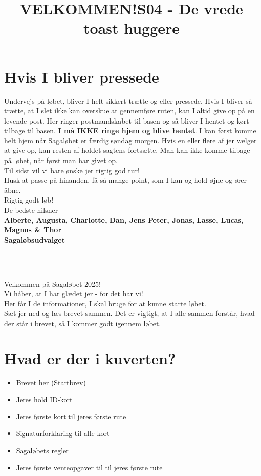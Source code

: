 \section{Hvis I bliver pressede}
Undervejs på løbet, bliver I helt sikkert trætte og eller pressede. Hvis I bliver så trætte, at I slet ikke kan overskue at gennemføre ruten, kan I altid give op på en levende post. Her ringer postmandskabet til basen og så bliver I hentet og kørt tilbage til basen. \textbf{I må IKKE ringe hjem og blive hentet}. I kan først komme helt hjem når Sagaløbet er færdig søndag morgen. Hvis en eller flere af jer vælger at give op, kan resten af holdet sagtens fortsætte. Man kan ikke komme tilbage på løbet, når først man har givet op.\\
\newline
Til sidst vil vi bare ønske jer rigtig god tur!\\
Husk at passe på hinanden, få så mange point, som I kan og hold øjne og ører åbne.\\
\newline
Rigtig godt løb!\\
\newline
\textcolor{søblå}{De bedste hilsner}\\
\textcolor{natblå}{\textbf{Alberte, Augusta, Charlotte, Dan, Jens Peter, Jonas, Lasse, Lucas, Magnus \& Thor}}\\
\textcolor{natblå}{\textbf{Sagaløbsudvalget}}\\
\newpage
\title{VELKOMMEN!}\\
\newline
\title{\textcolor{flammefarvet}{S04 - De vrede toast huggere }}\\
\newline
Velkommen på Sagaløbet 2025!\\
Vi håber, at I har glædet jer - for det har vi!\\
Her får I de informationer, I skal bruge for at kunne starte løbet.\\
Sæt jer ned og læs brevet sammen. Det er vigtigt, at I alle sammen forstår, hvad der står i brevet, så I kommer godt igennem løbet.
\section{Hvad er der i kuverten?}
\begin{itemize}
    \item Brevet her (Startbrev)
    \item Jeres hold ID-kort
    \item Jeres første kort til jeres første rute
    \item Signaturforklaring til alle kort
    \item Sagaløbets regler
    \item Jeres første venteopgaver til til jeres første rute
\end{itemize}
